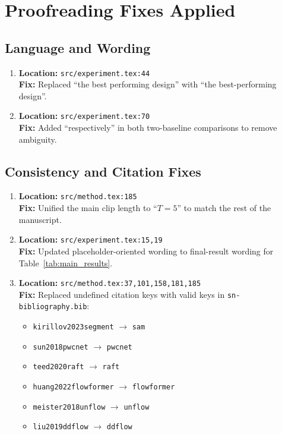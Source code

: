 \section*{Proofreading Fixes Applied}

\subsection*{Language and Wording}

\begin{enumerate}
    \item \textbf{Location:} \texttt{src/experiment.tex:44} \\
    \textbf{Fix:} Replaced ``the best performing design'' with ``the best-performing design''.

    \item \textbf{Location:} \texttt{src/experiment.tex:70} \\
    \textbf{Fix:} Added ``respectively'' in both two-baseline comparisons to remove ambiguity.
\end{enumerate}

\subsection*{Consistency and Citation Fixes}

\begin{enumerate}
    \item \textbf{Location:} \texttt{src/method.tex:185} \\
    \textbf{Fix:} Unified the main clip length to ``$T=5$'' to match the rest of the manuscript.

    \item \textbf{Location:} \texttt{src/experiment.tex:15,19} \\
    \textbf{Fix:} Updated placeholder-oriented wording to final-result wording for Table~\ref{tab:main_results}.

    \item \textbf{Location:} \texttt{src/method.tex:37,101,158,181,185} \\
    \textbf{Fix:} Replaced undefined citation keys with valid keys in \texttt{sn-bibliography.bib}:
    \begin{itemize}
        \item \texttt{kirillov2023segment} $\rightarrow$ \texttt{sam}
        \item \texttt{sun2018pwcnet} $\rightarrow$ \texttt{pwcnet}
        \item \texttt{teed2020raft} $\rightarrow$ \texttt{raft}
        \item \texttt{huang2022flowformer} $\rightarrow$ \texttt{flowformer}
        \item \texttt{meister2018unflow} $\rightarrow$ \texttt{unflow}
        \item \texttt{liu2019ddflow} $\rightarrow$ \texttt{ddflow}
    \end{itemize}
\end{enumerate}